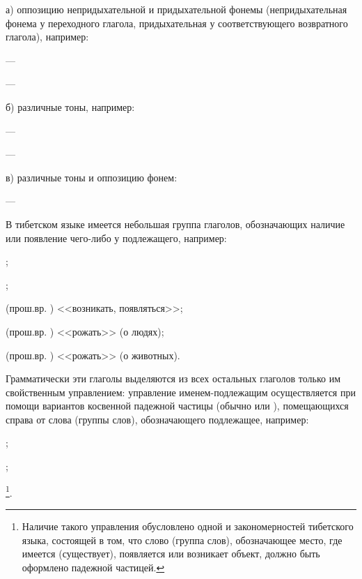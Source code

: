 а) оппозицию непридыхательной и придыхательной фонемы (непридыхательная фонема у переходного глагола, придыхательная у соответствующего возвратного глагола), например:
\begin{prfsample}
	\item {} --- 
	\item {} --- 
\end{prfsample}

б) различные тоны, например:
\begin{prfsample}
	\item {} --- 
	\item {} --- 
\end{prfsample}

в) различные тоны и оппозицию фонем:
\begin{prfsample}
	\item {} --- 
\end{prfsample}

В тибетском языке имеется небольшая группа глаголов,
обозначающих наличие или появление чего-либо у подлежащего, например:
\begin{prfsample}
	\item {};
	\item {};
	\item {} (прош.вр. ) <<возникать, появляться>>;
	\item {} (прош.вр. ) <<рожать>> (о людях);
	\item {} (прош.вр. ) <<рожать>> (о животных).
\end{prfsample}
Грамматически эти глаголы выделяются из всех остальных глаголов только им свойственным управлением: управление именем-подлежащим осуществляется при помощи вариантов косвенной падежной частицы (обычно  или ), помещающихся справа от слова (группы слов), обозначающего подлежащее, например:
\begin{prfsample}
	\item {};
	\item {};
	\item {}\footnote[34]{Наличие такого управления обусловлено одной и закономерностей тибетского языка, состоящей в том, что слово (группа слов), обозначающее место, где имеется (существует), появляется или возникает объект, должно быть оформлено падежной частицей.}.
\end{prfsample}

